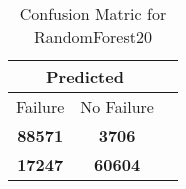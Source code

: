 \begin{table}[] 
\caption{Confusion Matric for RandomForest20} 
\label{Table: Prediction Accuracy-NoneRandomForest20OnlySunEKF-ignoreReflection100.9EKF-top2-Reflection} 
\centering 
\begin{tabular} 
 {@{}ccc@{}} 
\toprule 
\multicolumn{2}{c}{\textbf{Predicted}}
 \\ \midrule 
\multicolumn{1}{|c|}{Failure} & 
\multicolumn{1}{c|}{No Failure}
 \\ \midrule 
\multicolumn{1}{|c|}{\color{green}\textbf{88571}} & 
\multicolumn{1}{c|}{\color{red}\textbf{3706}}
 \\ \midrule 
\multicolumn{1}{|c|}{\color{red}\textbf{17247}} & 
\multicolumn{1}{c|}{\color{green}\textbf{60604}}
 \\ \bottomrule 
\end{tabular} 
\end{table} 
